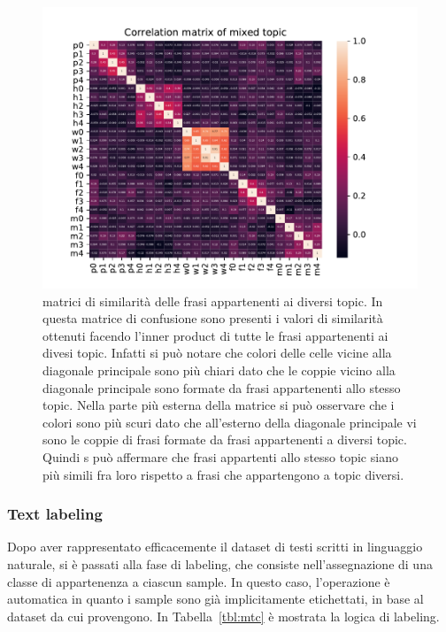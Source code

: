 \begin{figure}[h!t]
    \centering
    \includegraphics{Figure/simMatr/mixed.pdf}
    \caption{matrici di similarità delle frasi appartenenti ai diversi topic. In questa matrice di confusione sono presenti i valori di similarità ottenuti facendo l'inner product di tutte le frasi appartenenti ai divesi topic. Infatti si può notare che colori delle celle vicine alla diagonale principale sono più chiari dato che le coppie vicino alla diagonale principale sono formate da frasi appartenenti allo stesso topic. Nella parte più esterna della matrice si può osservare che i colori sono più scuri dato che all'esterno della diagonale principale vi sono le coppie di frasi formate da frasi appartenenti a diversi topic. Quindi s può affermare che frasi appartenti allo stesso topic siano più simili fra loro rispetto a frasi che appartengono a topic diversi.}
    \label{fig:mtrsim_mix}
\end{figure}
\FloatBarrier

\subsubsection{Text labeling}
\label{sssec:textlabeling}
Dopo aver rappresentato efficacemente il dataset di testi scritti in linguaggio naturale, si è passati alla fase di labeling, che consiste nell'assegnazione di una classe di appartenenza a ciascun sample. In questo caso, l'operazione è automatica in quanto i sample sono già implicitamente etichettati, in base al dataset da cui provengono. In Tabella~\ref{tbl:mtc} è mostrata la logica di labeling.


